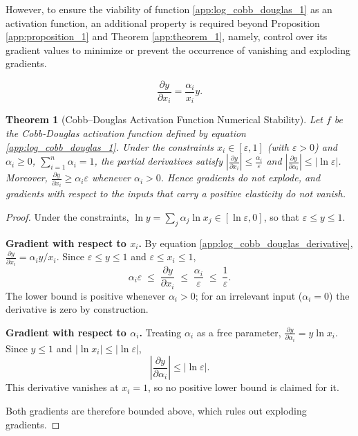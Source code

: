 \documentclass[preprint,12pt,authoryear]{sn-jnl}
\newtheorem{theorem}{Theorem}
\begin{document}
However, to ensure the viability of function \ref{app:log_cobb_douglas_1} as an activation function, an additional property is required beyond Proposition \ref{app:proposition_1} and Theorem \ref{app:theorem_1}, namely, control over its gradient values to minimize or prevent the occurrence of vanishing and exploding gradients.

\begin{equation} \label{app:log_cobb_douglas_derivative}
\frac{\partial y}{\partial x_i} = \frac{\alpha_i}{x_i}y.
\end{equation}

\begin{theorem}[Cobb--Douglas Activation Function Numerical Stability] \label{app:theorem_2}
Let $f$ be the Cobb-Douglas activation function defined by equation \ref{app:log_cobb_douglas_1}. Under the constraints $x_i \in [\varepsilon, 1]$ (with $\varepsilon > 0$) and $\alpha_i \geq 0$, $\sum_{i=1}^n \alpha_i = 1$, the partial derivatives satisfy $\left|\frac{\partial y}{\partial x_i}\right| \leq \frac{\alpha_i}{\varepsilon}$ and $\left|\frac{\partial y}{\partial \alpha_i}\right| \leq |\ln \varepsilon|$. Moreover, $\frac{\partial y}{\partial x_i} \geq \alpha_i \varepsilon$ whenever $\alpha_i > 0$. Hence gradients do not explode, and gradients with respect to the inputs that carry a positive elasticity do not vanish.
\end{theorem}

\begin{proof}
Under the constraints, $\ln y = \sum_j \alpha_j \ln x_j \in [\ln \varepsilon, 0]$, so that $\varepsilon \leq y \leq 1$. 

\textbf{Gradient with respect to $x_i$.} By equation \ref{app:log_cobb_douglas_derivative}, $\frac{\partial y}{\partial x_i} = \alpha_i y / x_i$. Since $\varepsilon \leq y \leq 1$ and $\varepsilon \leq x_i \leq 1$,
\[
\alpha_i \varepsilon \;\leq\; \frac{\partial y}{\partial x_i} \;\leq\; \frac{\alpha_i}{\varepsilon} \;\leq\; \frac{1}{\varepsilon}.
\]
The lower bound is positive whenever $\alpha_i > 0$; for an irrelevant input ($\alpha_i = 0$) the derivative is zero by construction.

\textbf{Gradient with respect to $\alpha_i$.} Treating $\alpha_i$ as a free parameter, $\frac{\partial y}{\partial \alpha_i} = y \ln x_i$. Since $y \leq 1$ and $|\ln x_i| \leq |\ln \varepsilon|$,
\[
\left|\frac{\partial y}{\partial \alpha_i}\right| \leq |\ln \varepsilon|.
\]
This derivative vanishes at $x_i = 1$, so no positive lower bound is claimed for it.

Both gradients are therefore bounded above, which rules out exploding gradients.
\end{proof}
\end{document}
